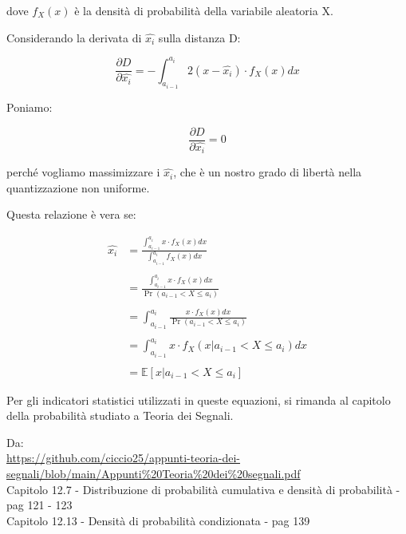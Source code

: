 dove $f_X (x)$ è la densità di probabilità della variabile aleatoria X. \newline 

Considerando la derivata di $\hat{x_i}$ sulla distanza D: 

{
    \Large 
    \begin{equation}
        \frac{\partial D}{\partial \hat{x_i}}
        =
        - \int_{a_{i-1}}^{a_i}
        2 (x - \hat{x_i}) \cdot f_X (x) dx
    \end{equation}
}

Poniamo: 

{
    \Large 
    \begin{equation}
        \frac{\partial D}{\partial \hat{x_i}}
        =
        0
    \end{equation}
}

perché vogliamo massimizzare i $\hat{x_i}$, che è un nostro grado di libertà nella quantizzazione non uniforme. \newline 

Questa relazione è vera se: 

{
    \Large 
    \begin{equation}
        \begin{split}
            \hat{x_i}
            &=
            \frac{\int_{a_{i-1}}^{a_i} x \cdot f_X (x) dx}{\int_{a_{i-1}}^{a_i} f_X (x) dx}
            \\
            &\quad
            \\
            &=
            \frac{\int_{a_{i-1}}^{a_i} x \cdot f_X (x) dx}{\Pr(a_{i-1} < X \le a_i)}
            \\
            &\quad
            \\
            &=
            \int_{a_{i-1}}^{a_i}
            \frac{ x \cdot f_X (x) dx}{\Pr(a_{i-1} < X \le a_i)}
            \\
            &\quad
            \\
            &=
            \int_{a_{i-1}}^{a_i}
            x \cdot f_X (x | a_{i-1} < X \le a_i ) dx 
            \\
            &\quad
            \\
            &= 
            \mathbb{E} \left[ x | a_{i-1} < X \le a_i \right]
        \end{split}
    \end{equation}
}

\begin{tcolorbox}
    Per gli indicatori statistici utilizzati in queste equazioni, 
    si rimanda al capitolo della probabilità studiato a Teoria dei Segnali. \newline 

      Da: \\
    \url{https://github.com/ciccio25/appunti-teoria-dei-segnali/blob/main/Appunti%20Teoria%20dei%20segnali.pdf} \\
    Capitolo 12.7 - Distribuzione di probabilità cumulativa e densità di probabilità - pag 121 - 123 \\
    Capitolo 12.13 - Densità di probabilità condizionata - pag 139  
\end{tcolorbox}

